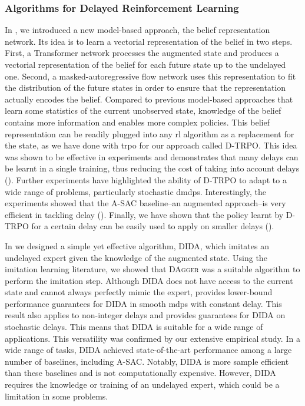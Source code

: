 \subsubsection{Algorithms for Delayed Reinforcement Learning}
In , we introduced a new model-based approach, the belief representation network.
Its idea is to learn a vectorial representation of the belief in two steps.
First, a Transformer network processes the augmented state and produces a vectorial representation of the belief for each future state up to the undelayed one.
Second, a masked-autoregressive flow network uses this representation to fit the distribution of the future states in order to ensure that the representation actually encodes the belief. 
Compared to previous model-based approaches that learn some statistics of the current unobserved state, knowledge of the belief contains more information and enables more complex policies. 
This belief representation can be readily plugged into any \gls{rl} algorithm as a replacement for the state, as we have done with \gls{trpo} for our approach called D-TRPO.
This idea was shown to be effective in experiments and demonstrates that many delays can be learnt in a single training, thus reducing the cost of taking into account delays ().
Further experiments have highlighted the ability of D-TRPO to adapt to a wide range of problems, particularly stochastic \glspl{dmdp}.
Interestingly, the experiments showed that the A-SAC baseline--an augmented approach--is very efficient in tackling delay ().
Finally, we have shown that the policy learnt by D-TRPO for a certain delay can be easily used to apply on smaller delays ().

In  we designed a simple yet effective algorithm, DIDA, which imitates an undelayed expert given the knowledge of the augmented state.
Using the imitation learning literature, we showed that \textsc{DAgger} was a suitable algorithm to perform the imitation step.
Although DIDA does not have access to the current state and cannot always perfectly mimic the expert,  provides lower-bound performance guarantees for DIDA in smooth \glspl{mdp} with constant delay.
This result also applies to non-integer delays and  provides guarantees for DIDA on stochastic delays.
This means that DIDA is suitable for a wide range of applications.
This versatility was confirmed by our extensive empirical study.
In a wide range of tasks, DIDA achieved state-of-the-art performance among a large number of baselines, including A-SAC.
Notably, DIDA is more sample efficient than these baselines and is not computationally expensive.
However, DIDA requires the knowledge or training of an undelayed expert, which could be a limitation in some problems.

